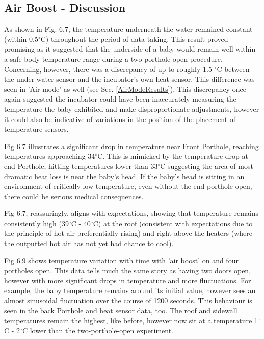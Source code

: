 \documentclass{article}
\begin{document}
\subsection{Air Boost - Discussion}

As shown in Fig. 6.7, the temperature underneath the water remained constant (within 0.5$^{\circ}$C) throughout the period of data taking. This result proved promising as it suggested that the underside of a baby would remain well within a safe body temperature \cite{JG4} range during a two-porthole-open procedure. Concerning, however, there was a discrepancy of up to roughly 1.5 $^{\circ}$C between the under-water sensor and the incubator’s own heat sensor. This difference was seen in 'Air mode' as well (see Sec. \ref{AirModeResults}). This discrepancy once again suggested the incubator could have been inaccurately measuring the temperature the baby exhibited  and make disproportionate adjustments, however it could also be indicative of variations in the position of the placement of temperature sensors.

  \vspace{3mm}

Fig 6.7 illustrates a significant drop in temperature near Front Porthole, reaching temperatures approaching 34$^{\circ}$C. This is mimicked by the temperature drop at end Porthole, hitting temperatures lower than 33$^{\circ}$C suggesting the area of most dramatic heat loss is near the baby’s head. If the baby’s head is sitting in an environment of critically low temperature, even without the end porthole open, there could be serious medical consequences. 

  \vspace{3mm}

Fig 6.7, reassuringly, aligns with expectations, showing that temperature remains consistently high (39$^{\circ}$C - 40$^{\circ}$C) at the roof (consistent with expectations due to the principle of hot air preferentially rising) and right above the heaters (where the outputted hot air has not yet had chance to cool). 

  \vspace{3mm}

Fig 6.9 shows temperature variation with time with 'air boost' on and four portholes open. This data tells much the same story as having two doors open, however with more significant drops in temperature and more fluctuations. For example, the baby temperature remains around its initial value, however sees an almost sinusoidal fluctuation over the course of 1200 seconds. This behaviour is seen in the back Porthole and heat sensor data, too. The roof and sidewall temperatures remain the highest, like before, however now sit at a temperature 1$^{\circ}$C - 2$^{\circ}$C lower than the two-porthole-open experiment. 
\end{document}
